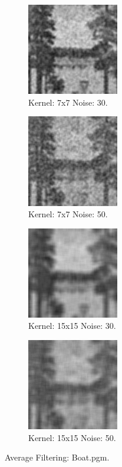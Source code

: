 \documentclass[letterpaper,10pt]{article}
\begin{document}
   \begin{figure}[hbtp]
    \centering
    \begin{subfigure}{4cm}
      \includegraphics[width=4cm]{images/median_boat_average_7_30.png}
      \caption{Kernel: 7x7 Noise: 30.}
    \end{subfigure}
    \begin{subfigure}{4cm}
      \includegraphics[width=4cm]{images/median_boat_average_7_50.png}
      \caption{Kernel: 7x7 Noise: 50.}
    \end{subfigure}
    \begin{subfigure}{4cm}
      \includegraphics[width=4cm]{images/median_boat_average_15_30.png}
      \caption{Kernel: 15x15 Noise: 30.}
    \end{subfigure}
    \begin{subfigure}{4cm}
      \includegraphics[width=4cm]{images/median_boat_average_15_50.png}
      \caption{Kernel: 15x15 Noise: 50.}
    \end{subfigure}
    \caption{Average Filtering: Boat.pgm.}
    \label{fig:averageboat}
  \end{figure}
\end{document}
